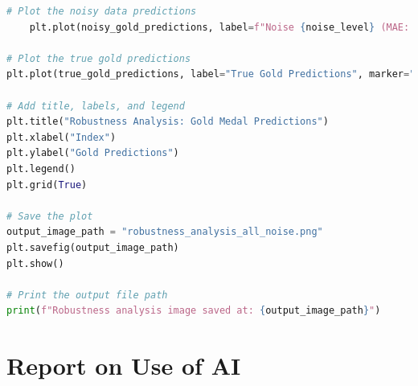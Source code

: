 \documentclass[12pt]{article}
\begin{document}
\begin{lstlisting}[language=Python, style=mystyle, caption=robust\_sensitivity.ipynb]
    # Plot the noisy data predictions
    plt.plot(noisy_gold_predictions, label=f"Noise {noise_level} (MAE: {mae_gold:.2f})", linestyle="--", marker="x")

# Plot the true gold predictions
plt.plot(true_gold_predictions, label="True Gold Predictions", marker="o", linewidth=2)

# Add title, labels, and legend
plt.title("Robustness Analysis: Gold Medal Predictions")
plt.xlabel("Index")
plt.ylabel("Gold Predictions")
plt.legend()
plt.grid(True)

# Save the plot
output_image_path = "robustness_analysis_all_noise.png"
plt.savefig(output_image_path)
plt.show()

# Print the output file path
print(f"Robustness analysis image saved at: {output_image_path}")
\end{lstlisting}


\section{Report on Use of AI}
\end{document}
